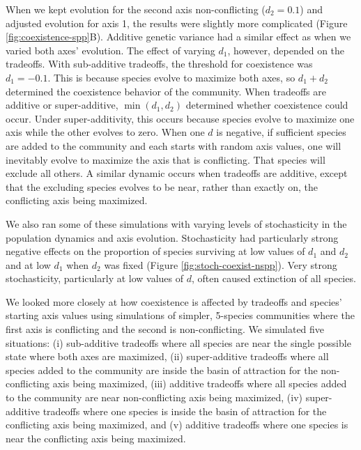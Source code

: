 When we kept evolution for the second axis non-conflicting ($d_2 = 0.1$) and
adjusted evolution for axis 1, the results were slightly more complicated
(Figure \ref{fig:coexistence-spp}B).
Additive genetic variance had a similar effect as when we varied both axes' evolution.
The effect of varying $d_1$, however, depended on the tradeoffs.
With sub-additive tradeoffs, the threshold for coexistence was $d_1 = -0.1$.
This is because species evolve to maximize both axes, so $d_1 + d_2$
determined the coexistence behavior of the community.
When tradeoffs are additive or super-additive, $\min (d_1, d_2)$ determined whether 
coexistence could occur.
Under super-additivity, this occurs because species evolve to maximize one axis while
the other evolves to zero.
When one $d$ is negative, if sufficient species are added to the community and 
each starts with random axis values, 
one will inevitably evolve to maximize the axis that is conflicting. 
That species will exclude all others.
A similar dynamic occurs when tradeoffs are additive, except that
the excluding species evolves to be near, rather than exactly on, 
the conflicting axis being maximized.




We also ran some of these simulations with varying levels of stochasticity
in the population dynamics and axis evolution.
Stochasticity had particularly strong negative effects on the proportion
of species surviving at low values of $d_1$ and $d_2$ and at low $d_1$
when $d_2$ was fixed (Figure \ref{fig:stoch-coexist-nspp}).
Very strong stochasticity, particularly at low values of $d$, often caused
extinction of all species.



We looked more closely at how coexistence is affected by tradeoffs and 
species' starting axis values
using simulations of simpler, 5-species communities where the first 
axis is conflicting and the second is non-conflicting.
We simulated five situations:
(i) sub-additive tradeoffs where all species are near the single
possible state where both axes are maximized,
(ii) super-additive tradeoffs where all species added to the community
are inside the basin of attraction for the non-conflicting axis
being maximized,
(iii) additive tradeoffs where all species added to the community
are near non-conflicting axis being maximized,
(iv) super-additive tradeoffs where one species is
inside the basin of attraction for the conflicting axis
being maximized,
and
(v) additive tradeoffs where one species is near the conflicting 
axis being maximized.

